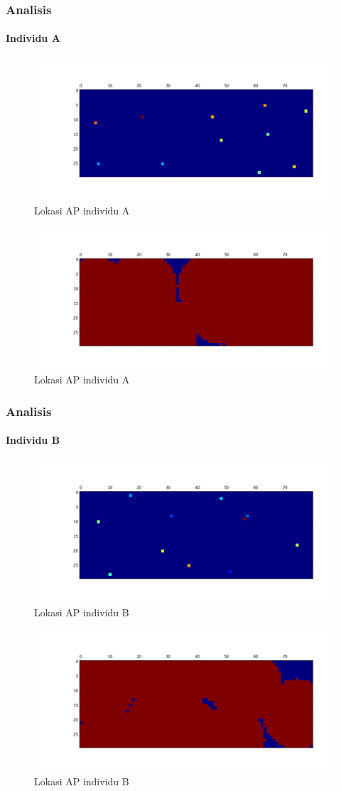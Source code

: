 \documentclass[12pt]{beamer}
\begin{document}
	\begin{frame}
		\frametitle{Analisis}
		\framesubtitle{Individu A}
		\begin{figure}[t]
		\centering
		\includegraphics[width=0.5\linewidth]{apLoc_02}
		\caption{Lokasi AP individu A}
		\label{fig:apLoc_02}
		\end{figure}
		\begin{figure}[t]
			\centering
			\includegraphics[width=0.5\linewidth]{coverage_02}
			\caption{Lokasi AP individu A}
			\label{fig:coverage_02}
		\end{figure}
	\end{frame}

	\begin{frame}
		\frametitle{Analisis}
		\framesubtitle{Individu B}
		\begin{figure}[t]
			\centering
			\includegraphics[width=0.5\linewidth]{apLoc_05}
			\caption{Lokasi AP individu B}
			\label{fig:apLoc_05}
		\end{figure}
		\begin{figure}[t]
			\centering
			\includegraphics[width=0.5\linewidth]{coverage_05}
			\caption{Lokasi AP individu B}
			\label{fig:coverage_05}
		\end{figure}
	\end{frame}
	
\end{document}

